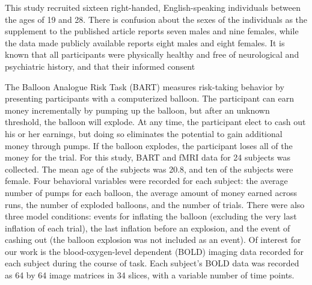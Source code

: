 \par This study recruited sixteen right-handed, English-speaking individuals between the ages of 19 and 28. There is confusion about the sexes of the individuals as the supplement to the published article reports seven males and nine females, while the data made publicly available reports eight males and eight females. It is known that all participants were physically healthy and free of neurological and psychiatric history, and that their informed consent 

\par \indent The Balloon Analogue Risk Task (BART) measures risk-taking behavior by presenting participants with a computerized balloon. The participant can earn money incrementally by pumping up the balloon, but after an unknown threshold, the balloon will explode. At any time, the participant elect to cash out his or her earnings, but doing so eliminates the potential to gain additional money through pumps. If the balloon explodes, the participant loses all of the money for the trial. For this study, BART and fMRI data for 24 subjects was collected. The mean age of the subjects was 20.8, and ten of the subjects were female. Four behavioral variables were recorded for each subject: the average number of pumps for each balloon, the average amount of money earned across runs, the number of exploded balloons, and the number of trials. There were also three model conditions: events for inflating the balloon (excluding the very last inflation of each trial), the last inflation before an explosion, and the event of cashing out (the balloon explosion was not included as an event). Of interest for our work is the blood-oxygen-level dependent (BOLD) imaging data recorded for each subject during the course of task. Each subject's BOLD data was recorded as 64 by 64 image matrices in 34 slices, with a variable number of time points. 